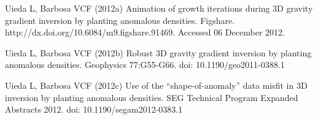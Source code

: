\documentclass[twocolumn,draft]{svjour3}
\begin{document}
\begin{thebibliography}{}
Uieda L, Barbosa VCF (2012a)
Animation of growth iterations during 3D gravity gradient inversion by planting
anomalous densities. Figshare. http://dx.doi.org/10.6084/m9.figshare.91469.
Accessed 06 December 2012.

Uieda L, Barbosa VCF (2012b)
Robust 3D gravity gradient inversion by planting anomalous densities.
Geophysics 77:G55-G66. doi: 10.1190/geo2011-0388.1

Uieda L, Barbosa VCF (2012c)
Use of the ``shape-of-anomaly'' data misfit in 3D inversion by planting
anomalous densities. SEG Technical Program Expanded Abstracts 2012.
doi: 10.1190/segam2012-0383.1

\end{thebibliography}
\end{document}
